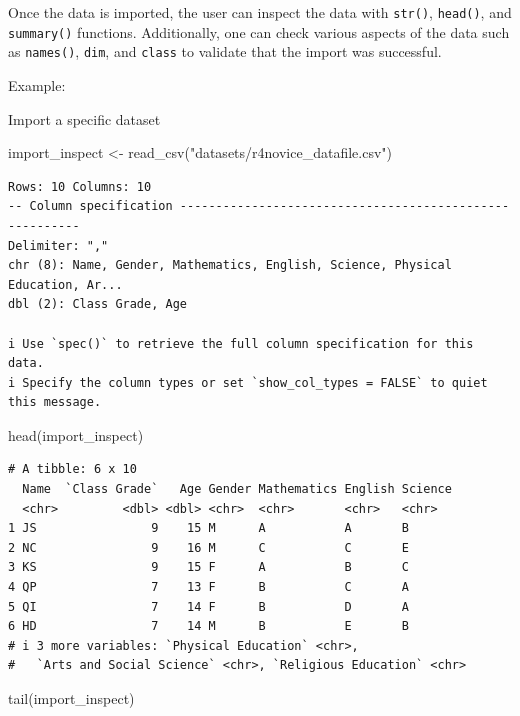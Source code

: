 \documentclass[
  letterpaper,
  DIV=11,
  numbers=noendperiod]{scrreprt}
\newenvironment{Shaded}{\begin{snugshade}}{\end{snugshade}}
\newcommand{\FunctionTok}[1]{\textcolor[rgb]{0.28,0.35,0.67}{#1}}
\newcommand{\NormalTok}[1]{\textcolor[rgb]{0.00,0.23,0.31}{#1}}
\newcommand{\OtherTok}[1]{\textcolor[rgb]{0.00,0.23,0.31}{#1}}
\newcommand{\StringTok}[1]{\textcolor[rgb]{0.13,0.47,0.30}{#1}}
\begin{document}
Once the data is imported, the user can inspect the data with
\texttt{str()}, \texttt{head()}, and \texttt{summary()} functions.
Additionally, one can check various aspects of the data such as
\texttt{names()}, \texttt{dim}, and \texttt{class} to validate that the
import was successful.

Example:

Import a specific dataset

\begin{Shaded}
\begin{Highlighting}[]
\NormalTok{import\_inspect }\OtherTok{\textless{}{-}} \FunctionTok{read\_csv}\NormalTok{(}\StringTok{"datasets/r4novice\_datafile.csv"}\NormalTok{)}
\end{Highlighting}
\end{Shaded}

\begin{verbatim}
Rows: 10 Columns: 10
-- Column specification --------------------------------------------------------
Delimiter: ","
chr (8): Name, Gender, Mathematics, English, Science, Physical Education, Ar...
dbl (2): Class Grade, Age

i Use `spec()` to retrieve the full column specification for this data.
i Specify the column types or set `show_col_types = FALSE` to quiet this message.
\end{verbatim}

\begin{Shaded}
\begin{Highlighting}[]
\FunctionTok{head}\NormalTok{(import\_inspect)}
\end{Highlighting}
\end{Shaded}

\begin{verbatim}
# A tibble: 6 x 10
  Name  `Class Grade`   Age Gender Mathematics English Science
  <chr>         <dbl> <dbl> <chr>  <chr>       <chr>   <chr>  
1 JS                9    15 M      A           A       B      
2 NC                9    16 M      C           C       E      
3 KS                9    15 F      A           B       C      
4 QP                7    13 F      B           C       A      
5 QI                7    14 F      B           D       A      
6 HD                7    14 M      B           E       B      
# i 3 more variables: `Physical Education` <chr>,
#   `Arts and Social Science` <chr>, `Religious Education` <chr>
\end{verbatim}

\begin{Shaded}
\begin{Highlighting}[]
\FunctionTok{tail}\NormalTok{(import\_inspect)}
\end{Highlighting}
\end{Shaded}
\end{document}
